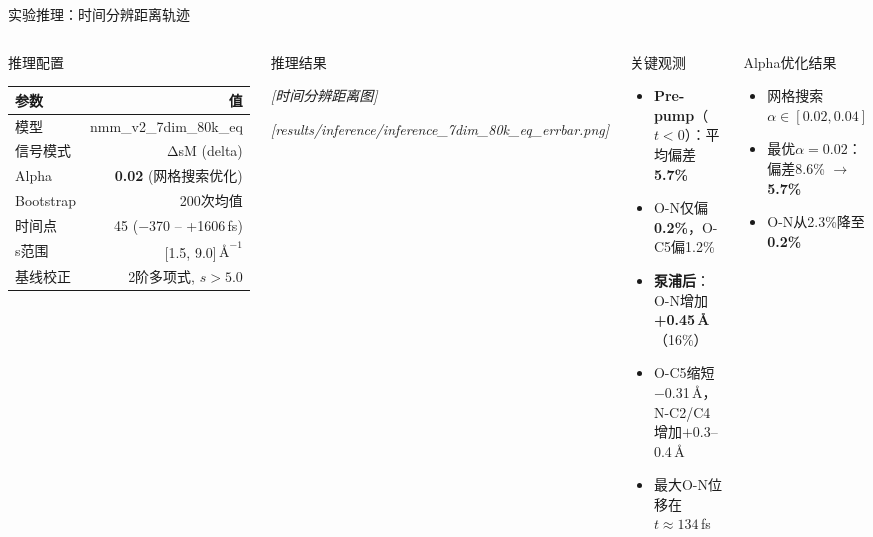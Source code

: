 \documentclass[aspectratio=169,9pt]{beamer}
\begin{document}
\begin{frame}{实验推理：时间分辨距离轨迹}
  \begin{columns}[T]
    \begin{block}{推理配置}
      \scriptsize
      \begin{tabular}{@{}lr@{}}
        \toprule
        参数 & 值 \\
        \midrule
        模型 & nmm\_v2\_7dim\_80k\_eq \\
        信号模式 & ΔsM (delta) \\
        Alpha & \textbf{0.02} (网格搜索优化) \\
        Bootstrap & 200次均值 \\
        时间点 & 45 ($-$370 -- +1606\,fs) \\
        s范围 & [1.5, 9.0]\,$\text{\AA}^{-1}$ \\
        基线校正 & 2阶多项式, $s > 5.0$ \\
        \bottomrule
      \end{tabular}
    \end{block}

    \begin{block}{推理结果}
      \scriptsize
      \begin{center}
        \textit{[时间分辨距离图]}

        \textit{[results/inference/inference\_7dim\_80k\_eq\_errbar.png]}
      \end{center}
    \end{block}

    \begin{block}{关键观测}
      \scriptsize
      \begin{itemize}
        \item \textbf{Pre-pump}（$t<0$）：平均偏差\textbf{5.7\%}
        \item O-N仅偏\textbf{0.2\%}，O-C5偏1.2\%
        \item \textbf{泵浦后}：O-N增加\textbf{+0.45\,\AA}（16\%）
        \item O-C5缩短$-$0.31\,\AA，N-C2/C4增加$+$0.3--0.4\,\AA
        \item 最大O-N位移在$t \approx 134$\,fs
      \end{itemize}
    \end{block}

    \begin{exampleblock}{Alpha优化结果}
      \scriptsize
      \begin{itemize}
        \item 网格搜索$\alpha \in [0.02, 0.04]$
        \item 最优$\alpha = 0.02$：偏差8.6\% $\to$ \textbf{5.7\%}
        \item O-N从2.3\%降至\textbf{0.2\%}
      \end{itemize}
    \end{exampleblock}
  \end{columns}
\end{frame}
\end{document}
